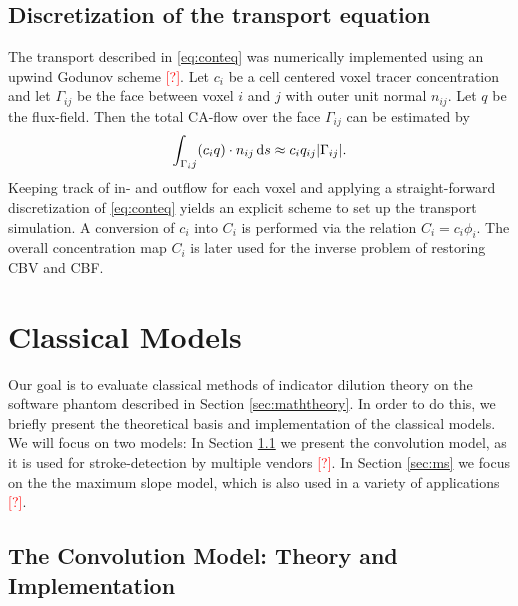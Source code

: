 \documentclass[paper=a4, fontsize=12pt,parskip=half, draft, headings=small]{scrartcl}
\newcommand{\missingsource}{\textcolor{red}{[?]}}
\begin{document}
	\subsection{Discretization of the transport equation} \label{sec:numtrans}
	The transport described in \eqref{eq:conteq} was numerically implemented using an upwind Godunov scheme \missingsource.
	Let $c_i$ be a cell centered voxel tracer concentration and let $\Gamma_{ij}$ be the face between voxel $i$ and $j$ with outer unit normal $n_{ij}$.
	Let $q$ be the flux-field. 
	Then the total CA-flow over the face $\Gamma_{ij}$ can be estimated by
	\[
		\int_{\Gamma_ij} (c_i q)\cdot n_{ij} \,\mathrm{d} s \approx c_i q_{ij} \vert \Gamma_{ij} \vert.
	\]
	Keeping track of in- and outflow for each voxel and applying a straight-forward discretization of \eqref{eq:conteq} yields an explicit scheme to set up the transport simulation.
	A conversion of $c_i$ into $C_i$ is performed via the relation $C_i = c_i\phi_i$. 
	The overall concentration map $C_i$ is later used for the inverse problem of restoring CBV and CBF.



	\section{Classical Models} \label{sec:classical}
	
	Our goal is to evaluate classical methods of indicator dilution theory on the software phantom described in Section \ref{sec:maththeory}.
	In order to do this, we briefly present the theoretical basis and implementation of the classical models.
	We will focus on two models:
	In Section \ref{sec:conv} we present the convolution model, as it is used for stroke-detection by multiple vendors \missingsource.
	In Section \ref{sec:ms} we focus on the the maximum slope model, which is also used in a variety of applications \missingsource.

	\subsection{The Convolution Model: Theory and Implementation}\label{sec:conv}
	
\end{document}
